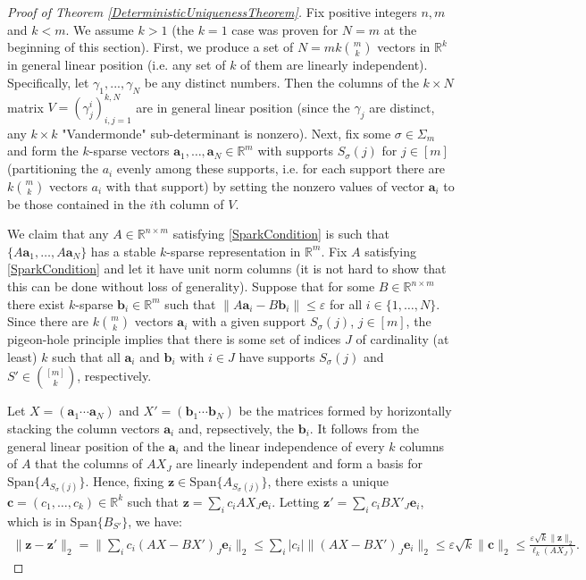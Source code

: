 \documentclass[journal, onecolumn]{IEEEtran}
\begin{document}
\begin{proof}[Proof of Theorem \ref{DeterministicUniquenessTheorem}]
Fix positive integers $n, m$ and $k < m$. We assume $k > 1$ (the $k=1$ case was proven for $N=m$ at the beginning of this section). First, we produce a set of $N = mk{m \choose k}$ vectors in $\mathbb{R}^k$ in general linear position (i.e. any set of $k$ of them are linearly independent). Specifically, let $\gamma_1, ..., \gamma_N$ be any distinct numbers. Then the columns of the $k \times N$ matrix $V = (\gamma^i_j)^{k,N}_{i,j=1}$ are in general linear position (since the $\gamma_j$ are distinct, any $k \times k$ "Vandermonde" sub-determinant is nonzero). Next, fix some $\sigma \in \Sigma_m$ and form the $k$-sparse vectors $\mathbf{a}_1, \ldots, \mathbf{a}_N \in \mathbb{R}^m$ with supports $S_\sigma(j)$ for $j \in [m]$ (partitioning the $a_i$ evenly among these supports, i.e. for each support there are $k{m \choose k}$ vectors $a_i$ with that support) by setting the nonzero values of vector $\mathbf{a}_i$ to be those contained in the $i$th column of $V$.

We claim that any $A \in \mathbb{R}^{n \times m}$ satisfying \eqref{SparkCondition} is such that $\{A\mathbf{a}_1, \ldots, A\mathbf{a}_N\}$ has a stable $k$-sparse representation in $\mathbb{R}^m$. Fix $A$ satisfying \eqref{SparkCondition} and let it have unit norm columns (it is not hard to show that this can be done without loss of generality). Suppose that for some $B \in \mathbb{R}^{n \times m}$ there exist $k$-sparse $\mathbf{b}_i \in \mathbb{R}^m$ such that $\|A\mathbf{a}_i - B\mathbf{b}_i\| \leq \varepsilon$ for all $i \in \{1, \ldots, N\}$. Since there are $k{m \choose k}$ vectors $\mathbf{a}_i$ with a given support $S_\sigma(j)$, $j \in [m]$, the pigeon-hole principle implies that there is some set of indices $J$ of cardinality (at least) $k$ such that all $\mathbf{a}_i$ and $\mathbf{b}_i$ with $i \in J$ have supports $S_\sigma(j)$ and $S' \in {[m] \choose k}$, respectively.

Let $X = (\mathbf{a}_1 \cdots \mathbf{a}_N)$ and $X' = (\mathbf{b}_1 \cdots \mathbf{b}_N)$ be the matrices formed by horizontally stacking the column vectors $\mathbf{a}_i$ and, repsectively, the $\mathbf{b}_i$. It follows from the general linear position of the $\mathbf{a}_i$ and the linear independence of every $k$ columns of $A$ that the columns of $AX_J$ are linearly independent and form a basis for $\text{Span}\{A_{S_\sigma(j)}\}$. Hence, fixing $\mathbf{z} \in \text{Span}\{A_{S_\sigma(j)}\}$, there exists a unique $\mathbf{c} = (c_1, \ldots, c_k) \in \mathbb{R}^k$ such that $\mathbf{z} = \sum_i c_iAX_J\mathbf{e}_i$. Letting $\mathbf{z'} = \sum_i c_iBX'_J\mathbf{e}_i$, which is in $\text{Span}\{B_{S'}\}$, we have:
\begin{align*}
\|\mathbf{z} - \mathbf{z'}\|_2 = \|\sum_ic_i(AX - BX')_J\mathbf{e}_i\|_2 
\leq \sum_i |c_i| \|(AX - BX')_J\mathbf{e}_i\|_2  
\leq \varepsilon \sqrt{k} \|\mathbf{c}\|_2 
\leq \frac{\varepsilon \sqrt{k} \|\mathbf{z}\|_2}{\ell_k(AX_J)}.
\end{align*}


\end{proof}
\end{document}
